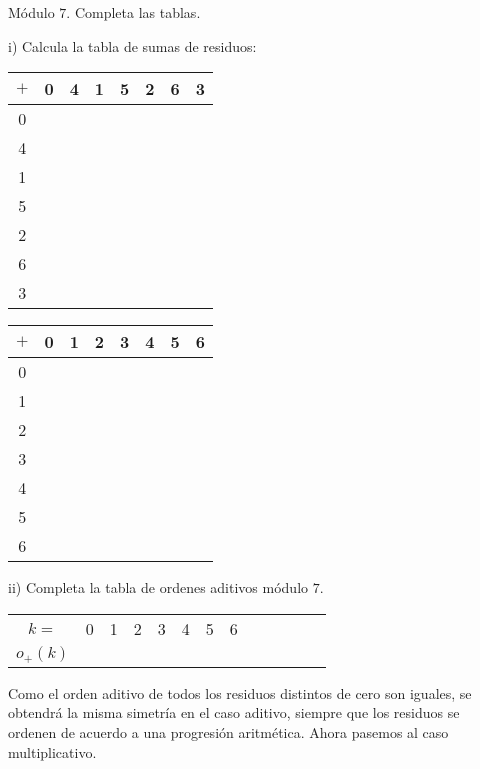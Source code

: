 \begin{ejercicio}
Módulo $7$. Completa las tablas. 

i) Calcula la tabla de sumas de residuos:

 \begin{tabular}{|c||c|c|c|c|c|c|c|} 
 \hline
  $+$ & 0 & 4 & 1 & 5 & 2 & 6 & 3\\ 
  \hline
  \hline
  0 &  & & & & & &\\ 
  \hline
  4 &  & & & & & &\\
    \hline
  1 &  & & & & & &\\
      \hline
  5 &  & & & & & &\\ 
        \hline
  2 &  & & & & & &\\ 
          \hline
  6 &  & & & & & &\\ 
            \hline
  3 &  & & & & & &\\ 
  \hline
\end{tabular}
\hspace{.5cm}
 \begin{tabular}{|c||c|c|c|c|c|c|c|} 
 \hline
  $+$ & 0 & 1 & 2 & 3 & 4 & 5 & 6\\ 
  \hline
  \hline
  0 &  & & & & & &\\ 
  \hline
  1 &  & & & & & &\\
    \hline
  2 &  & & & & & &\\
      \hline
  3 &  & & & & & &\\ 
        \hline
  4 &  & & & & & &\\ 
          \hline
  5 &  & & & & & &\\ 
            \hline
  6 &  & & & & & &\\ 
  \hline
\end{tabular}

ii) Completa la tabla de ordenes aditivos módulo $7$.

\begin{tabular}{c||c|c|c|c|c|c|c|c|c|c|c|c|}
    $k=$ & 0 & 1 & 2 & 3 & 4 & 5 & 6 \\
    $o_{+}(k)$ & &&&&&& 
\end{tabular}

Como el orden aditivo de todos los residuos distintos de cero son iguales, se obtendrá la misma simetría en el caso aditivo, siempre que los residuos se ordenen de acuerdo a una progresión aritmética. Ahora pasemos al caso multiplicativo.


\end{ejercicio}
